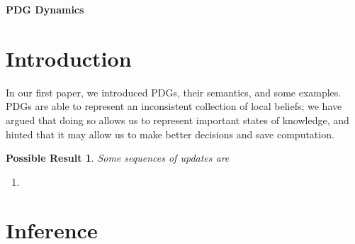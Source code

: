 \documentclass{article}
\theoremstyle{plain}
\newtheorem{poss}{Possible Result}
\theoremstyle{definition}
\begin{document}
\begin{center}
	{\bfseries\Large PDG Dynamics}
\end{center}	
	
\section{Introduction}
In our first paper, we introduced PDGs, their semantics, and some examples. 
PDGs are able to represent an inconsistent collection of local beliefs; we have argued that doing so allows us to represent important states of knowledge, and hinted that it may allow us to make better decisions and save computation. 



\begin{poss}
	Some sequences of updates are 
\end{poss}



\begin{enumerate}
	\item 
\end{enumerate}


\section{Inference}

  
\end{document}
